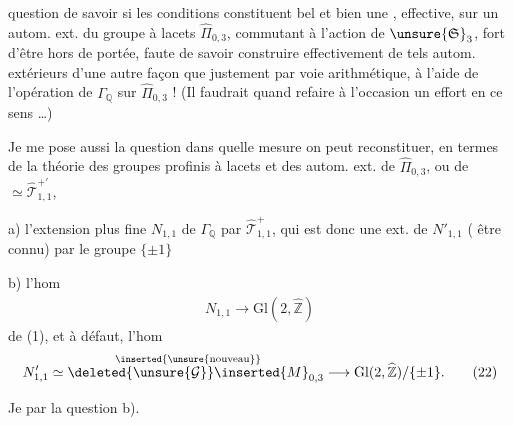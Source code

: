 
question de savoir si les conditions constituent bel et bien une , effective, sur un autom. ext. du groupe à lacets $\widehat{\Pi}_{0,3}$, commutant à l'action de $\unsure{\mathfrak{S}}_3$,  fort d'être hors de portée, faute de savoir construire effectivement de tels autom. extérieurs  d'une autre façon que justement par voie arithmétique, à l'aide de l'opération de $\Gamma_{\mathbb{Q}}$ sur $\widehat{\Pi}_{0,3}$ ! (Il faudrait quand  refaire à l'occasion un effort en ce sens \ldots)

Je me pose aussi la question dans quelle mesure on peut reconstituer, en termes de la théorie des groupes profinis à lacets et des  autom. ext. de $\widehat{\Pi}_{0,3}$, ou de  $\simeq \widehat{\mathcal{T}}_{1,1}^{+\prime}$, 



a) l'extension plus fine $N_{1,1}$ de $\Gamma_{\mathbb{Q}}$ par $\widehat{\mathcal{T}}_{1,1}^{+}$, qui est donc une ext. de $N'_{1,1}$ ( être connu) par le groupe $\{\pm1\}$

b) l'hom
\[
\begin{array}{|c|}
\hline
N_{1,1}\longrightarrow \mathrm{Gl}(2,\widehat{\mathbb{Z}})
\end{array}
\tag{21}
\]
de (1), et à défaut, l'hom
\[
N'_{1,1}\simeq
\overset{\inserted{\unsure{\text{nouveau}}}}{\deleted{\unsure{\mathcal{G}}}\inserted{M}}_{0,3}
\longrightarrow
\mathrm{Gl}(2,\widehat{\mathbb{Z}})/\{\pm1\}.
\tag{22}
\]

Je  par la question b).

